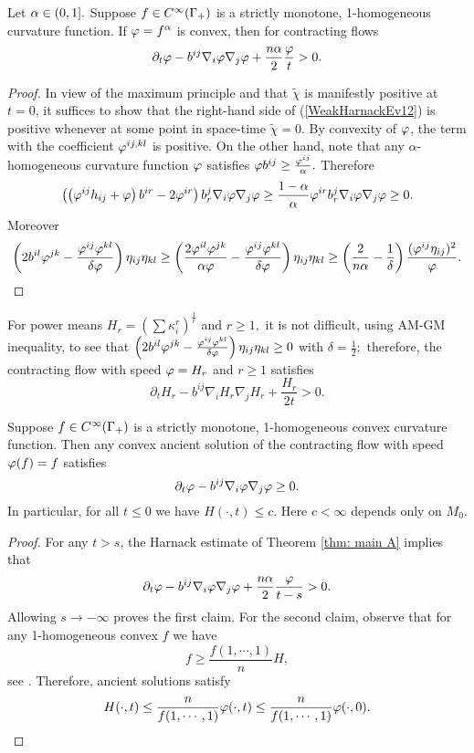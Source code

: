 \documentclass{amsart}
\begin{document}
\begin{theorem}\label{thm: main A}
Let $\alpha\in(0,1].$ Suppose $f\in C^{\infty}(\Gamma_+)$ is a strictly monotone, 1-homogeneous curvature function. If $\varphi=f^{\alpha}$ is convex, then for contracting flows
$$\partial_t \varphi-b^{ij}\nabla_i\varphi\nabla_j\varphi+\frac{n\alpha}{2}\frac{\varphi}{t}>0.$$
\end{theorem}
\begin{proof}
In view of the maximum principle and that $\tilde{\chi}$ is manifestly positive at $t=0$, it suffices to show that the right-hand side of (\ref{WeakHarnackEv12}) is positive whenever at some point in space-time $\tilde{\chi}=0$. By convexity of $\varphi$, the term with the coefficient $\varphi^{ij,kl}$ is positive. On the other hand, note that any $\alpha$-homogeneous curvature function $\varphi$ satisfies $\varphi b^{ij}\geq \frac{\varphi^{ij}}{\alpha}.$ Therefore
$$\left(\left(\varphi^{ij}h_{ij}+\varphi\right)b^{ir}-2\varphi^{ir}\right)b^{j}_{r}\nabla_{i}\varphi\nabla_{j}\varphi\ge \frac{1-\alpha}{\alpha}\varphi^{ir}b^{j}_{r}\nabla_{i}\varphi\nabla_{j}\varphi\ge 0.$$ Moreover
$$\left(2b^{il}\varphi^{jk}-\frac{\varphi^{ij}\varphi^{kl}}{\delta\varphi}\right)\eta_{ij}\eta_{kl}\geq \left(\frac{2\varphi^{il}\varphi^{jk}}{\alpha\varphi}-\frac{\varphi^{ij}\varphi^{kl}}{\delta\varphi}\right)\eta_{ij}\eta_{kl}\geq \left(\frac{2}{n\alpha}-\frac{1}{\delta}\right)\frac{(\varphi^{ij}\eta_{ij})^2}{\varphi}.$$
\end{proof}
\begin{remark}
For power means $H_r=\left(\sum \kappa_i^r\right)^{\frac{1}{r}}$ and $r\geq 1,$ it is not difficult, using AM-GM inequality, to see that $\left(2b^{il}\varphi^{jk}-\frac{\varphi^{ij}\varphi^{kl}}{\delta\varphi}\right)\eta_{ij}\eta_{kl}\geq0$ with $\delta=\frac{1}{2};$ therefore, the contracting flow with speed $\varphi=H_r$ and $r\geq 1$ satisfies 
$$\partial_t H_r-b^{ij}\nabla_iH_r\nabla_jH_r+\frac{H_r}{2t}>0.$$
\end{remark}
\begin{corollary}
Suppose $f\in C^{\infty}(\Gamma_+)$ is a strictly monotone, 1-homogeneous convex curvature function. Then any convex ancient solution of the contracting flow with speed $\varphi(f)=f$ satisfies
\[\partial_t \varphi-b^{ij}\nabla_i\varphi\nabla_j\varphi\geq 0.\]
In particular, for all $t\le 0$ we have
$H(\cdot,t)\leq c.$
Here $c<\infty$ depends only on $M_0.$
\end{corollary}
\begin{proof}
For any $t>s$, the  Harnack estimate of Theorem \ref{thm: main A} implies that
$$\partial_t \varphi-b^{ij}\nabla_i\varphi\nabla_j\varphi+\frac{n\alpha}{2}\frac{\varphi}{t-s}>0.$$
Allowing $s\to-\infty$ proves the first claim. For the second claim, observe that for any 1-homogeneous convex $f$ we have \[f\ge \frac{f(1,\cdots,1)}{n}H,\]
see \cite[Chapter 2]{Gerhardt:/2006}. Therefore, ancient solutions satisfy
\[H(\cdot,t)\leq \frac{n}{f(1,\cdots,1)}\varphi(\cdot,t)\leq \frac{n}{f(1,\cdots,1)}\varphi(\cdot,0). \]
\end{proof}
\end{document}
